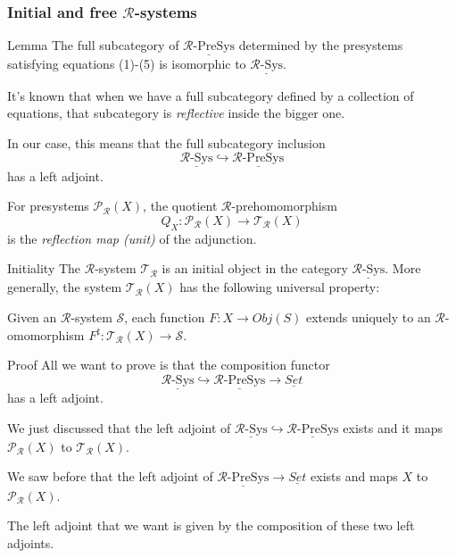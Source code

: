 \documentclass{beamer}
\begin{document}
\begin{frame}
    \small 
    \frametitle{Initial and free $\mathcal{R}$-systems}
    \begin{block}{Lemma}
        The full subcategory of $\underline{\mathcal{R}\text{-PreSys}}$ determined  
        by the presystems satisfying equations (1)-(5) is isomorphic to $\underline{\mathcal{R}\text{-Sys}}$.
    \end{block}

    \bigskip
    It's known that when we have a full subcategory defined by a collection of equations, that subcategory  is 
    \emph{reflective} inside the bigger one. 
    
    In our case, this means that the full subcategory inclusion 
    $$ \underline{\mathcal{R}\text{-Sys}} \hookrightarrow \underline{\mathcal{R}\text{-PreSys}}$$
    has a left adjoint.

    \bigskip
    \pause
    For presystems $\mathcal{P_R}(X)$, the quotient $\mathcal{R}$-prehomomorphism 
    $$Q_X:\mathcal{P_R}(X) \rightarrow \mathcal{T_R}(X)$$
    is the \emph{reflection map (unit)} of the adjunction.

\end{frame}
\begin{frame}
    \scriptsize
    \begin{block}{Initiality}
        The $\mathcal{R}$-system $\mathcal{T_R}$ is an initial object in the category 
        $\underline{\mathcal{R}\text{-Sys}}$. More generally, the system $\mathcal{T_R}(X)$ has the following universal property:

        \medskip
        Given an $\mathcal{R}$-system $\mathcal{S}$, each function $F:X \rightarrow Obj(S)$ extends uniquely 
        to an $\mathcal{R}$-omomorphism $F^\sharp: \mathcal{T_R}(X) \rightarrow \mathcal{S}$.
    \end{block}
    \pause
    \begin{block}{Proof}
        All we want to prove is that the composition functor 
        $$ \underline{\mathcal{R}\text{-Sys}} \hookrightarrow \underline{\mathcal{R}\text{-PreSys}} \rightarrow \underline{Set}$$
        has a left adjoint. 

        \pause
        We just discussed that the left adjoint of $ \underline{\mathcal{R}\text{-Sys}} \hookrightarrow \underline{\mathcal{R}\text{-PreSys}}$ exists and it maps 
        $\mathcal{P_R}(X)$ to $\mathcal{T_R}(X)$.
        
        \pause
        We saw before that the left adjoint of $\underline{\mathcal{R}\text{-PreSys}} \rightarrow \underline{Set}$ exists and maps $X$ to $\mathcal{P_R}(X)$.
        
        \pause
        The left adjoint that we want is given by the composition of these two left adjoints.
    \end{block}
\end{frame}
\end{document}
